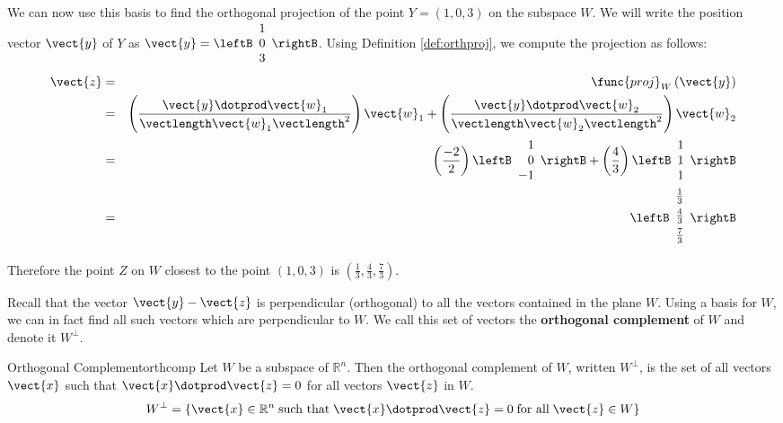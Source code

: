 \begin{solution}
We can now use this basis to find the orthogonal projection of the
point $Y=(1,0,3)$ on the subspace $W$. We will write the position
vector $\vect{y}$ of $Y$ as $\vect{y} = \leftB \begin{array}{c} 1 \\ 0 \\ 3
\end{array} \rightB$. Using Definition \ref{def:orthproj}, we compute the projection as follows:
\begin{eqnarray*}
\vect{z} &=& \func{proj}_{W}\left( \vect{y}\right)\\
&=&
\left( \frac{\vect{y} \dotprod \vect{w}_1}{ \vectlength \vect{w}_1 \vectlength^2}\right) \vect{w}_1
+
\left( \frac{\vect{y} \dotprod \vect{w}_2}{ \vectlength \vect{w}_2 \vectlength^2}\right) \vect{w}_2 \\
&=&
\left( \frac{-2}{2} \right) \leftB
\begin{array}{r}
1 \\
0 \\
-1
\end{array}
\rightB
+
\left( \frac{4}{3} \right)
\leftB
\begin{array}{c}
1 \\
1 \\
1 
\end{array}
\rightB \\
&=& 
\leftB
\begin{array}{c}
\vspace{0.05in}\frac{1}{3} \\
\vspace{0.05in}\frac{4}{3} \\
\vspace{0.05in}\frac{7}{3} 
\end{array}
\rightB
\end{eqnarray*}

Therefore the point $Z$ on $W$ closest to the point $(1,0,3)$  is $\left( \frac{1}{3}, \frac{4}{3}, \frac{7}{3} \right)$. 

\end{solution}

Recall that the vector $\vect{y} - \vect{z}$ is perpendicular
(orthogonal) to all the vectors contained in the plane $W$. Using a
basis for $W$, we can in fact find all such vectors which are
perpendicular to $W$. We call this set of vectors the
\textbf{orthogonal complement}  of $W$ and
denote it $W^{\perp}$.

\begin{definition}{Orthogonal Complement}{orthcomp}
Let $W$ be a subspace of $\mathbb{R}^n$. Then the orthogonal
complement of $W$, written $W^{\perp}$, is the set of all vectors
$\vect{x}$ such that $\vect{x} \dotprod \vect{z} = 0$ for all vectors
$\vect{z}$ in $W$.
\[
W^{\perp} = \{ \vect{x} \in \mathbb{R}^n \; \mbox{such that} \;
\vect{x} \dotprod \vect{z} = 0 \; \mbox{for all} \; \vect{z} \in W \}
\]
\end{definition}


